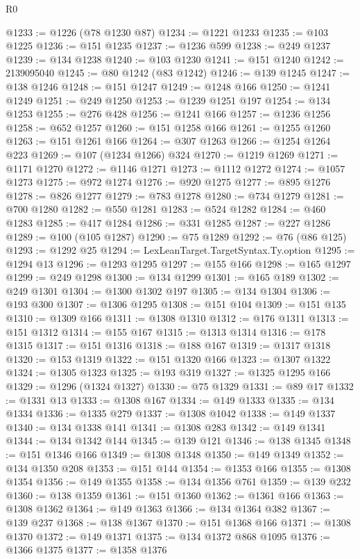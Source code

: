 \begin{lexlean}{R0}
\begin{coremodule}
@1233 := @1226 (@78 @1230 @87)
@1234 := @1221 @1233
@1235 := @103 @1225
@1236 := @151 @1235
@1237 := @1236 @599
@1238 := @249 @1237
@1239 := @134 @1238
@1240 := @103 @1230
@1241 := @151 @1240
@1242 := 2139095040
@1245 := @80 @1242 (@83 @1242)
@1246 := @139 @1245
@1247 := @138 @1246
@1248 := @151 @1247
@1249 := @1248 @166
@1250 := @1241 @1249
@1251 := @249 @1250
@1253 := @1239 @1251 @197
@1254 := @134 @1253
@1255 := @276 @428
@1256 := @1241 @166
@1257 := @1236 @1256
@1258 := @652 @1257
@1260 := @151 @1258 @166
@1261 := @1255 @1260
@1263 := @151 @1261 @166
@1264 := @307 @1263
@1266 := @1254 @1264 @223
@1269 := @107 (@1234 @1266) @324
@1270 := @1219 @1269
@1271 := @1171 @1270
@1272 := @1146 @1271
@1273 := @1112 @1272
@1274 := @1057 @1273
@1275 := @972 @1274
@1276 := @920 @1275
@1277 := @895 @1276
@1278 := @826 @1277
@1279 := @783 @1278
@1280 := @734 @1279
@1281 := @700 @1280
@1282 := @550 @1281
@1283 := @524 @1282
@1284 := @460 @1283
@1285 := @417 @1284
@1286 := @331 @1285
@1287 := @227 @1286
@1289 := @100 (@105 @1287)
@1290 := @75 @1289
@1292 := @76 (@86 @125)
@1293 := @1292 @25
@1294 := LexLeanTarget.TargetSyntax.Ty.option
@1295 := @1294 @13
@1296 := @1293 @1295
@1297 := @155 @166
@1298 := @165 @1297
@1299 := @249 @1298
@1300 := @134 @1299
@1301 := @165 @189
@1302 := @249 @1301
@1304 := @1300 @1302 @197
@1305 := @134 @1304
@1306 := @193 @300
@1307 := @1306 @1295
@1308 := @151 @104
@1309 := @151 @135
@1310 := @1309 @166
@1311 := @1308 @1310
@1312 := @176 @1311
@1313 := @151 @1312
@1314 := @155 @167
@1315 := @1313 @1314
@1316 := @178 @1315
@1317 := @151 @1316
@1318 := @188 @167
@1319 := @1317 @1318
@1320 := @153 @1319
@1322 := @151 @1320 @166
@1323 := @1307 @1322
@1324 := @1305 @1323
@1325 := @193 @319
@1327 := @1325 @1295 @166
@1329 := @1296 (@1324 @1327)
@1330 := @75 @1329
@1331 := @89 @17
@1332 := @1331 @13
@1333 := @1308 @167
@1334 := @149 @1333
@1335 := @134 @1334
@1336 := @1335 @279
@1337 := @1308 @1042
@1338 := @149 @1337
@1340 := @134 @1338 @141
@1341 := @1308 @283
@1342 := @149 @1341
@1344 := @134 @1342 @144
@1345 := @139 @121
@1346 := @138 @1345
@1348 := @151 @1346 @166
@1349 := @1308 @1348
@1350 := @149 @1349
@1352 := @134 @1350 @208
@1353 := @151 @144
@1354 := @1353 @166
@1355 := @1308 @1354
@1356 := @149 @1355
@1358 := @134 @1356 @761
@1359 := @139 @232
@1360 := @138 @1359
@1361 := @151 @1360
@1362 := @1361 @166
@1363 := @1308 @1362
@1364 := @149 @1363
@1366 := @134 @1364 @382
@1367 := @139 @237
@1368 := @138 @1367
@1370 := @151 @1368 @166
@1371 := @1308 @1370
@1372 := @149 @1371
@1375 := @134 @1372 @868 @1095
@1376 := @1366 @1375
@1377 := @1358 @1376

\end{coremodule}
\end{lexlean}
